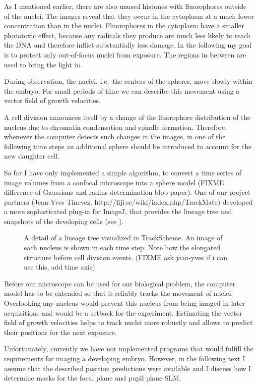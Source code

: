 As I mentioned earlier, there are also unused histones with
fluorophores outside of the nuclei. The images reveal that they occur
in the cytoplasm at a much lower concentration than in the
nuclei. Fluorophores in the cytoplasm have a smaller phototoxic
effect, because any radicals they produce are much less likely to
reach the DNA and therefore inflict substantially less damage.
In the following my goal is to protect only out-of-focus nuclei from
exposure. The regions in between are used to bring the light in.


During observation, the nuclei, i.e.\ the centers of the spheres, move
slowly within the embryo. For small periods of time we can describe
this movement using a vector field of growth velocities.

A cell
division announces itself by a change of the fluorophore distribution of the nucleus
due to chromatin condensation and spindle formation. Therefore, whenever the computer
detects such changes in the images, in one of the following time
steps an additional sphere should be introduced to account for the new
daughter cell.

So far I have only implemented a simple algorithm, to convert a time
series of image volumes from a confocal microscope into a sphere model
(FIXME difference of Gaussians and radius determination blob paper).
One of our project partners (Jean-Yves Tinevez,
http://fiji.sc/wiki/index.php/TrackMate) developed a more
sophisticated plug-in for ImageJ, that provides the lineage tree and
snapshots of the developing cells (see ).
\begin{figure}[!hbt]
  \centering
  \caption{ A detail of a lineage tree visualized in TrackScheme. An
    image of each nucleus is shown in each time step. Note how the
    elongated structure before cell division events. (FIXME ask jean-yves if
    i can use this, add time axis)}
  \label{fig:trackmate}
\end{figure}
Before our microscope can be used for our biological problem, the
computer model has to be extended so that it reliably tracks the
movement of nuclei.  Overlooking any nucleus would prevent this nucleus from being 
imaged in later acquisitions and would be a setback for the experiment.  Estimating the
vector field of growth velocities helps to track nuclei more robustly
and allows to predict their positions for the next exposure.


Unfortunately, currently we have not implemented programs that would
fulfill the requirements for imaging a developing embryo.  However, in
the following text I assume that the described position predictions
were available and I discuss how I determine masks for the focal
plane and pupil plane SLM.  

